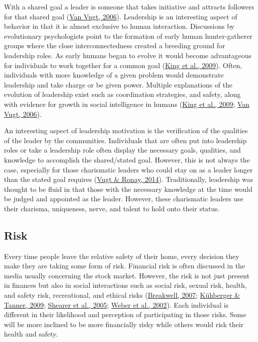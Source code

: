 \documentclass[
  donotrepeattitle,doc, 12pt, a4paper,floatsintext]{apa7}
\begin{document}
With a shared goal a leader is someone that takes initiative and attracts followers for that shared goal (\protect\hyperlink{ref-vanvugt2006}{Van Vugt, 2006}). Leadership is an interesting aspect of behavior in that it is almost exclusive to human interaction. Discussions by evolutionary psychologists point to the formation of early human hunter-gatherer groups where the close interconnectedness created a breeding ground for leadership roles. As early humans began to evolve it would become advantageous for individuals to work together for a common goal (\protect\hyperlink{ref-king2009}{King et al., 2009}). Often, individuals with more knowledge of a given problem would demonstrate leadership and take charge or be given power. Multiple explanations of the evolution of leadership exist such as coordination strategies, and safety, along with evidence for growth in social intelligence in humans (\protect\hyperlink{ref-king2009}{King et al., 2009}; \protect\hyperlink{ref-vanvugt2006}{Van Vugt, 2006}).

An interesting aspect of leadership motivation is the verification of the qualities of the leader by the communities. Individuals that are often put into leadership roles or take a leadership role often display the necessary goals, qualities, and knowledge to accomplish the shared/stated goal. However, this is not always the case, especially for those charismatic leaders who could stay on as a leader longer than the stated goal requires (\protect\hyperlink{ref-vugt2014}{Vugt \& Ronay, 2014}). Traditionally, leadership was thought to be fluid in that those with the necessary knowledge at the time would be judged and appointed as the leader. However, these charismatic leaders use their charisma, uniqueness, nerve, and talent to hold onto their status.

\hypertarget{risk}{%
\subsection{Risk}\label{risk}}

Every time people leave the relative safety of their home, every decision they make they are taking some form of risk. Financial risk is often discussed in the media usually concerning the stock market. However, the risk is not just present in finances but also in social interactions such as social risk, sexual risk, health, and safety risk, recreational, and ethical risks (\protect\hyperlink{ref-breakwell2007}{Breakwell, 2007}; \protect\hyperlink{ref-kuhberger2009}{Kühberger \& Tanner, 2009}; \protect\hyperlink{ref-shearer2005}{Shearer et al., 2005}; \protect\hyperlink{ref-weber2002}{Weber et al., 2002}). Each individual is different in their likelihood and perception of participating in those risks. Some will be more inclined to be more financially risky while others would risk their health and safety.
\end{document}
